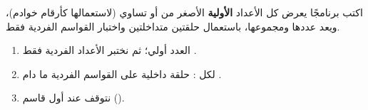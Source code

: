 \clearpage
{}

\begin{statement}
اكتب برنامجًا يعرض كل الأعداد \textbf{الأولية} الأصغر من أو تساوي  (لاستعمالها كأرقام خوادم)، ويعد عددها ومجموعها، باستعمال حلقتين متداخلتين واختبار القواسم الفردية فقط.
\end{statement}
\begin{stepsbox}\begin{enumerate}
\item العدد  أولي؛ ثم نختبر الأعداد الفردية فقط .
\item لكل : حلقة داخلية على القواسم الفردية  ما دام .
\item نتوقف عند أول قاسم ().
\end{enumerate}\end{stepsbox}
